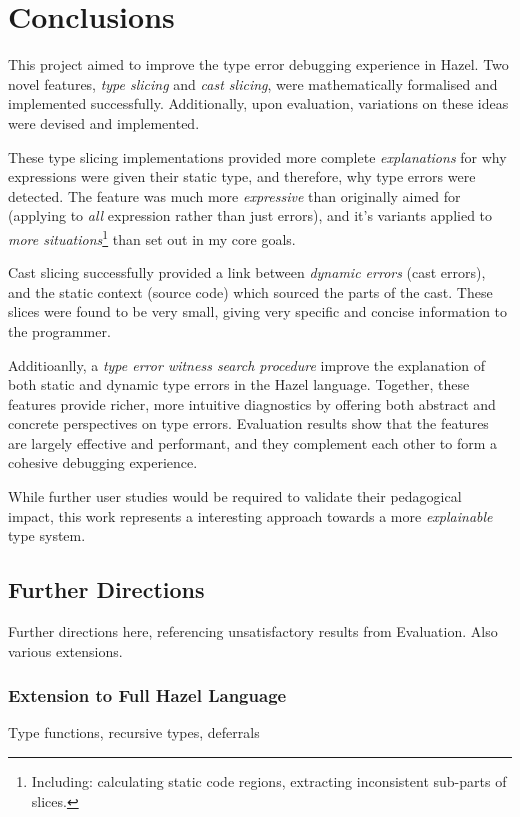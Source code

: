 \chapter{Conclusions}\label{chap:Conclusions}
This project aimed to improve the type error debugging experience in Hazel. Two novel features, \textit{type slicing} and \textit{cast slicing}, were mathematically formalised and implemented successfully. Additionally, upon evaluation, variations on these ideas were devised and implemented. 

These type slicing implementations provided more complete \textit{explanations} for why expressions were given their static type, and therefore, why type errors were detected. The feature was much more \textit{expressive} than originally aimed for (applying to \textit{all} expression rather than just errors), and it's variants applied to \textit{more situations}\footnote{Including: calculating static code regions, extracting inconsistent sub-parts of slices.} than set out in my core goals.

Cast slicing successfully provided a link between \textit{dynamic errors} (cast errors), and the static context (source code) which sourced the parts of the cast. These slices were found to be very small, giving very specific and concise information to the programmer.

Additioanlly, a \textit{type error witness search procedure}  improve the explanation of both static and dynamic type errors in the Hazel language. Together, these features provide richer, more intuitive diagnostics by offering both abstract and concrete perspectives on type errors. Evaluation results show that the features are largely effective and performant, and they complement each other to form a cohesive debugging experience. 

While further user studies would be required to validate their pedagogical impact, this work represents a interesting approach towards a more \textit{explainable} type system.

\section{Further Directions}
Further directions here, referencing unsatisfactory results from Evaluation. Also various extensions.
\subsection{Extension to Full Hazel Language}
Type functions, recursive types, deferrals

